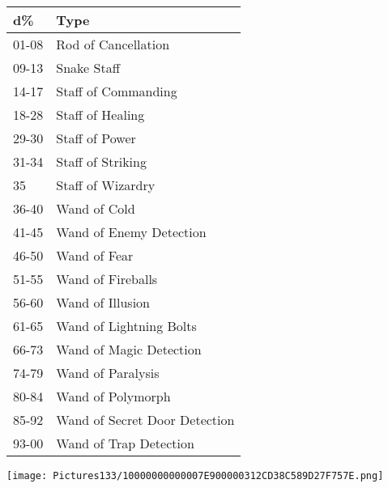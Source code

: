 \documentclass[a4paper,twoside,openany,10pt]{book}
\begin{document}
\begin{multicols}{2}
\begin{tabular*}{0.93\linewidth}{@{\extracolsep{\fill}}ll}
\textbf{d\%} & \textbf{Type} \\\toprule
01-08 & Rod of Cancellation \\\hline
09-13 & Snake Staff \\\hline
14-17 & Staff of Commanding \\\hline
18-28 & Staff of Healing \\\hline
29-30 & Staff of Power \\\hline
31-34 & Staff of Striking \\\hline
35 & Staff of Wizardry \\\hline
36-40 & Wand of Cold \\\hline
41-45 & Wand of Enemy Detection \\\hline
46-50 & Wand of Fear \\\hline
51-55 & Wand of Fireballs \\\hline
56-60 & Wand of Illusion \\\hline
61-65 & Wand of Lightning Bolts \\\hline
66-73 & Wand of Magic Detection \\\hline
74-79 & Wand of Paralysis \\\hline
80-84 & Wand of Polymorph \\\hline
85-92 & Wand of Secret Door Detection \\\hline
93-00 & Wand of Trap Detection \\\bottomrule
\end{tabular*}

\end{multicols}

\vfill

 \texttt{[image: Pictures133/10000000000007E900000312CD38C589D27F757E.png]} 
 
 \pagebreak
 
\end{document}
